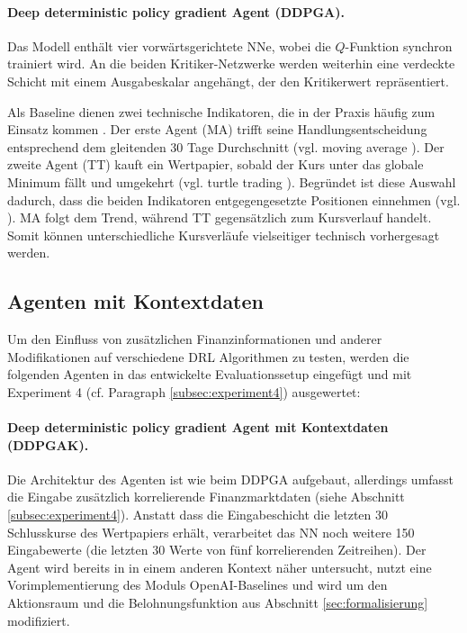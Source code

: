 \paragraph{Deep deterministic policy gradient Agent (\acs{DDPGA}).} Das Modell enthält vier vorwärtsgerichtete \acs{NN}e, wobei die $Q$-Funktion synchron trainiert wird. An die beiden Kritiker-Netzwerke werden weiterhin eine verdeckte Schicht mit einem Ausgabeskalar angehängt, der den Kritikerwert repräsentiert.

Als Baseline dienen zwei technische Indikatoren, die in der Praxis häufig zum Einsatz kommen \parencite{WU2020142,théate2020application}. Der erste Agent (\acs{MA}) trifft seine Handlungsentscheidung entsprechend dem gleitenden 30 Tage Durchschnitt (vgl. moving average \parencite{movingaverage}). Der zweite Agent (\acs{TT}) kauft ein Wertpapier, sobald der Kurs unter das globale Minimum fällt und umgekehrt (vgl. turtle trading \parencite{turtle}). Begründet ist diese Auswahl dadurch, dass die beiden Indikatoren entgegengesetzte Positionen einnehmen (vgl. \parencite{théate2020application}). \acs{MA} folgt dem Trend, während \acs{TT} gegensätzlich zum Kursverlauf handelt.
Somit können unterschiedliche Kursverläufe vielseitiger technisch vorhergesagt werden.

\subsection{Agenten mit Kontextdaten}
\label{sec:erweiterung}

Um den Einfluss von zusätzlichen Finanzinformationen und anderer Modifikationen auf verschiedene \acs{DRL} Algorithmen zu testen, werden die folgenden Agenten in das entwickelte Evaluationssetup eingefügt und mit Experiment 4 (cf. Paragraph \ref{subsec:experiment4}) ausgewertet:

\paragraph{Deep deterministic policy gradient Agent mit Kontextdaten (\acs{DDPGAK}).} Die Architektur des Agenten ist wie beim \acs{DDPGA} aufgebaut, allerdings umfasst die Eingabe zusätzlich korrelierende Finanzmarktdaten (siehe Abschnitt \ref{subsec:experiment4}). Anstatt dass die Eingabeschicht die letzten 30 Schlusskurse des Wertpapiers erhält, verarbeitet das \acs{NN} noch weitere 150 Eingabewerte (die letzten 30 Werte von fünf korrelierenden Zeitreihen). Der Agent wird bereits in \parencite{paperrepo2} in einem anderen Kontext näher untersucht, nutzt eine Vorimplementierung des Moduls OpenAI-Baselines und wird um den Aktionsraum und die Belohnungsfunktion aus Abschnitt \ref{sec:formalisierung} modifiziert.

